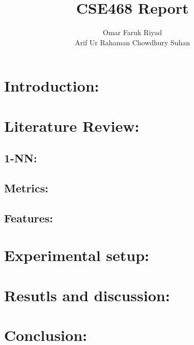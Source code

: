 \documentclass[12pt,a4paper] {article}
\author
	{
		Omar Faruk Riyad \\ 
		Arif Ur Rahaman Chowdhury Suhan
	}
\title
	{
		CSE468 Report
	}
\begin{document}
	\maketitle

	\pagebreak
	\section{Introduction:}
	
	

	\section{Literature Review:}

	\subsection{1-NN:}
	\subsection{Metrics:}
	\subsection{Features:}
	

	\section{Experimental setup:}


	\section{Resutls and discussion:}


	\section{Conclusion:}
\end{document}
